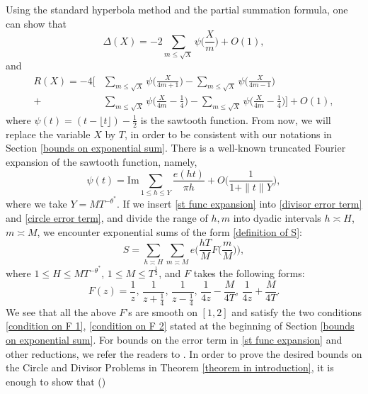 \documentclass[11pt]{amsart}
\numberwithin{equation}{section}
\theoremstyle{definition}
\theoremstyle{proposition}
\begin{document}
Using the standard hyperbola method and the partial summation formula, one can show that \cite[Theorem 4.5 and 4.8]{GrahamKolesnik1991} 
\begin{equation}  \label{divisor error term}
\Delta (X)=-2\sum_{m\le \sqrt{X}} \psi\Big(\frac{X}{m}\Big)+O(1),    
\end{equation}
and 
\begin{equation}   \label{circle error term}
\begin{split}
R(X)=-4 \Big[ &\sum_{m\le \sqrt{X}}\psi\Big(\frac{X}{4m+1}\Big)-\sum_{m\le \sqrt{X}}\psi\Big(\frac{X}{4m-1}\Big)
\\ +&\sum_{m\le \sqrt{X}}\psi\Big( \frac{X}{4m}-\frac{1}{4}\Big)-\sum_{m\le \sqrt{X}}\psi\Big( \frac{X}{4m}-\frac{1}{4}\Big) \Big] +O(1),
\end{split}    
\end{equation}
where $\psi(t)=(t-\lfloor t\rfloor)-\frac{1}{2}$ is the sawtooth function. From now, we will replace the variable $X$ by $T$, in order to be consistent with our notations in Section \ref{bounds on exponential sum}. There is a well-known truncated Fourier expansion of the sawtooth function, namely, 
\begin{equation}  \label{st func expansion}
\psi(t)=\text{Im} \sum_{1\le h\le Y}  \frac{e(ht)}{\pi h}+O\Big(\frac{1}{1+\|t\|Y}\Big),     
\end{equation}
where we take $Y=MT^{-\theta^*}$. If we insert \eqref{st func expansion} into \eqref{divisor error term} and \eqref{circle error term}, and divide the range of $h,m$ into dyadic intervals $h\asymp H$, $m\asymp M$, we encounter exponential sums of the form \eqref{definition of S}: 
\begin{equation}   \label{definition of S again}
S=\sum_{h\asymp H} \sum_{m\asymp M} e\Big(\frac{hT}{M}F\Big(\frac{m}{M}\Big)\Big),    
\end{equation}
where $1\le H\le MT^{-\theta^*}$, $1\le M\le T^{\frac{1}{2}}$, and $F$ takes the following forms:
\[
F(z)=\frac{1}{z}, \, \frac{1}{z+\frac{1}{4}}, \,  \frac{1}{z-\frac{1}{4}}, \, \frac{1}{4z}-\frac{M}{4T}, \, \frac{1}{4z}+\frac{M}{4T}. 
\]
We see that all the above $F$'s are smooth on $[1,2]$ and satisfy the two conditions \eqref{condition on F 1}, \eqref{condition on F 2} stated at the beginning of Section \ref{bounds on exponential sum}. For bounds on the error term in \eqref{st func expansion} and other reductions, we refer the readers to \cite[Section 7]{BourgainWatt2nd}. In order to prove the desired bounds on the Circle and Divisor Problems in Theorem \ref{theorem in introduction}, it is enough to show that (\cite[(7.7)]{BourgainWatt2nd})
\end{document}

